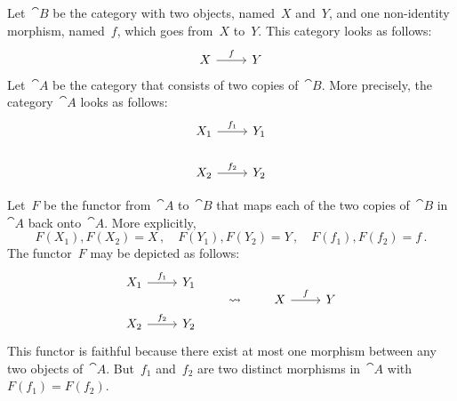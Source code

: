 \subsection{}

Let~$\cat{B}$ be the category with two objects, named~$X$ and~$Y$, and one non-identity morphism, named~$f$, which goes from~$X$ to~$Y$.
This category looks as follows:
\[
	\begin{tikzcd}
		X
		\arrow{r}[above]{f}
		&
		Y
	\end{tikzcd}
\]
Let~$\cat{A}$ be the category that consists of two copies of~$\cat{B}$.
More precisely, the category~$\cat{A}$ looks as follows:
\[
	\begin{tikzcd}
		X_1
		\arrow{r}[above]{f_1}
		&
		Y_1
		\\
		X_2
		\arrow{r}[above]{f_2}
		&
		Y_2
	\end{tikzcd}
\]

Let~$F$ be the functor from~$\cat{A}$ to~$\cat{B}$ that maps each of the two copies of~$\cat{B}$ in~$\cat{A}$ back onto~$\cat{A}$.
More explicitly,
\[
	F(X_1), F(X_2) = X \,,
	\quad
	F(Y_1), F(Y_2) = Y \,,
	\quad
	F(f_1), F(f_2) = f \,.
\]
The functor~$F$ may be depicted as follows:
\[
	\begin{tikzcd}
		X_1
		\arrow{r}[above]{f_1}
		&
		Y_1
		\\
		X_2
		\arrow{r}[above]{f_2}
		&
		Y_2
	\end{tikzcd}
	\qquad\leadsto\qquad
	\begin{tikzcd}
		X
		\arrow{r}[above]{f}
		&
		Y
	\end{tikzcd}
\]
This functor is faithful because there exist at most one morphism between any two objects of~$\cat{A}$.
But~$f_1$ and~$f_2$ are two distinct morphisms in~$\cat{A}$ with~$F(f_1) = F(f_2)$.
